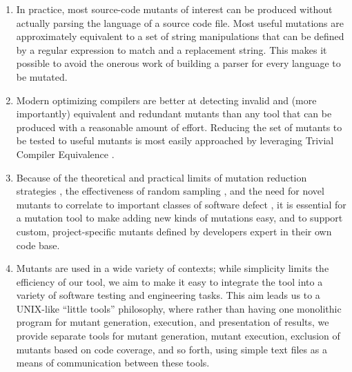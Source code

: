 \begin{enumerate}
\item In practice, most source-code mutants of interest can be
  produced without actually parsing the language of a source code
  file.  Most useful mutations are approximately equivalent to a
  set of string manipulations that can be defined by a regular
  expression to match and a replacement string.  This makes it
  possible to avoid the onerous work of building a parser for every
  language to be mutated.
\item Modern optimizing compilers are better at detecting invalid and
  (more importantly) equivalent and redundant mutants than any tool
  that can be produced with a reasonable amount of effort.  Reducing
  the set of mutants to be tested to useful mutants is most easily
  approached by leveraging Trivial Compiler Equivalence \cite{TCE,HaririETAL2016ISSRE}.
\item Because of the theoretical and practical limits of mutation
  reduction strategies \cite{Gopinath1,Gopinath2}, the
  effectiveness of random sampling \cite{Gopinath3}, and the need for
  novel mutants to correlate to important classes of software defect
  \cite{Just2014mutants,GligoricETAL2017ICSENIER,HaririETAL2018ICST}, it is essential for a mutation tool to make adding new
  kinds of mutations easy, and to support custom, project-specific
  mutants defined by developers expert in their own code base.
\item Mutants are used in a wide variety of contexts; while simplicity limits
  the efficiency of our tool, we aim to make it easy to integrate the tool
  into a variety of software testing and engineering tasks.
  This aim leads us to a UNIX-like ``little tools''
  philosophy, where rather than having one monolithic program for
  mutant generation, execution, and presentation of results, we
  provide separate tools for mutant generation, mutant execution,
  exclusion of mutants based on code coverage, and so forth, using
  simple text files as a means of communication between these tools.
\end{enumerate}

